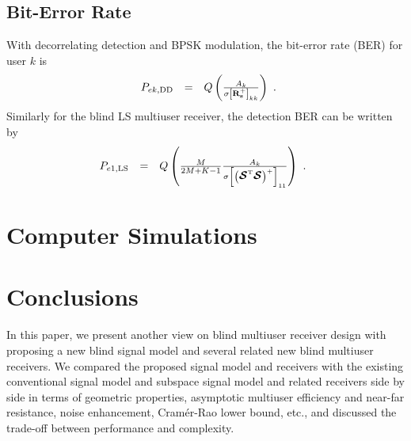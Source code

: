 \documentclass[a4paper,10pt,fleqn, twocolumn]{IEEETran}
\newcommand{\bs}{{\bf s}}
\newcommand{\bR}{{\bf R}}
\newcommand{\bcS}{{\mbox {\boldmath ${\cal S}$}}}
\begin{document}
\subsection{Bit-Error Rate}
With decorrelating detection and BPSK modulation, the bit-error
rate (BER) for user $k$ is
\begin{equation}
\begin{array}{rcl}
P_{ek,\rm\small DD} &=&
Q\left(\frac{A_{k}}{\sigma\left[\bR_{\bs}^{+}\right]_{kk}}\right)
\end{array}.\label{BER_DD}
\end{equation}
\noindent Similarly for the blind LS multiuser receiver, the
detection BER can be written by
\begin{equation}\hspace{-0.07in}
\begin{array}{rcl}
P_{e1,\rm\small LS} &=&
Q\left(\frac{M}{2M+K-1}\frac{A_k}{\sigma\left[\left(\bcS^{\rm
T}\bcS\right)^{+}\right]_{11}}\right)\ .
\end{array}\label{BER_LS}
\end{equation}

\section{Computer Simulations}
\section{Conclusions}
In this paper, we present another view on blind multiuser receiver
design with proposing a new blind signal model and several related
new blind multiuser receivers. We compared the proposed signal
model and receivers with the existing conventional signal model
and subspace signal model and related receivers side by side in
terms of geometric properties, asymptotic multiuser efficiency and
near-far resistance, noise enhancement, Cram\'{e}r-Rao lower
bound, etc., and discussed the trade-off between performance and
complexity.

\small


\end{document}
